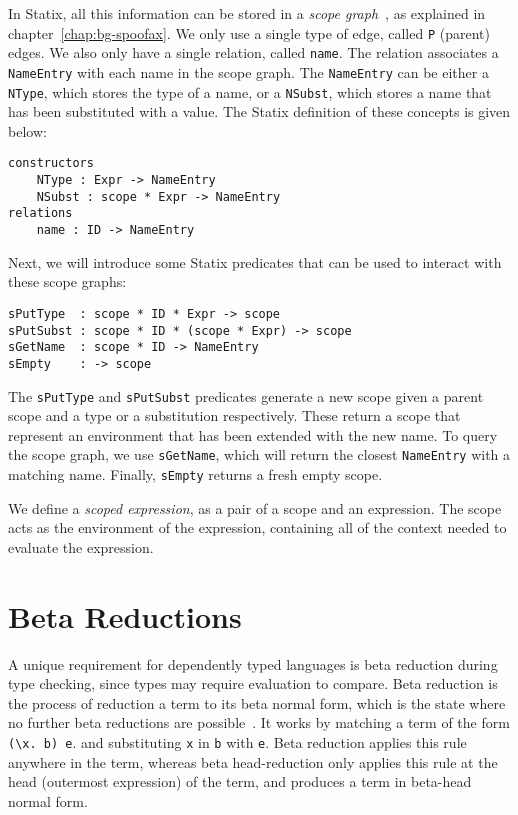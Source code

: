 In Statix, all this information can be stored in a \emph{scope graph}~\cite{scope_graphs}, as explained in chapter~\ref{chap:bg-spoofax}. We only use a single type of edge, called \verb|P| (parent) edges. We also only have a single relation, called \verb|name|. The relation associates a \verb|NameEntry| with each name in the scope graph. The \verb|NameEntry| can be either a \verb|NType|, which stores the type of a name, or a \verb|NSubst|, which stores a name that has been substituted with a value. The Statix definition of these concepts is given below:
\begin{lstlisting}
constructors
    NType : Expr -> NameEntry
    NSubst : scope * Expr -> NameEntry
relations
    name : ID -> NameEntry
\end{lstlisting}

Next, we will introduce some Statix predicates that can be used to interact with these scope graphs:

\begin{lstlisting}
sPutType  : scope * ID * Expr -> scope
sPutSubst : scope * ID * (scope * Expr) -> scope
sGetName  : scope * ID -> NameEntry
sEmpty    : -> scope
\end{lstlisting}
The \verb|sPutType| and \verb|sPutSubst| predicates generate a new scope given a parent scope and a type or a substitution respectively. These return a scope that represent an environment that has been extended with the new name. To query the scope graph, we use \verb|sGetName|, which will return the closest \verb|NameEntry| with a matching name. Finally, \verb|sEmpty| returns a fresh empty scope.

We define a \emph{scoped expression}, as a pair of a scope and an expression. The scope acts as the environment of the expression, containing all of the context needed to evaluate the expression.

\section{Beta Reductions}
\label{sec:coc-dynsyms}

A unique requirement for dependently typed languages is beta reduction during type checking, since types may require evaluation to compare. Beta reduction is the process of reduction a term to its beta normal form, which is the state where no further beta reductions are possible~\cite{tapl}. It works by matching a term of the form \verb|(\x. b) e|. and substituting \verb|x| in \verb|b| with \verb|e|. Beta reduction applies this rule anywhere in the term, whereas beta head-reduction only applies this rule at the head (outermost expression) of the term, and produces a term in beta-head normal form.

